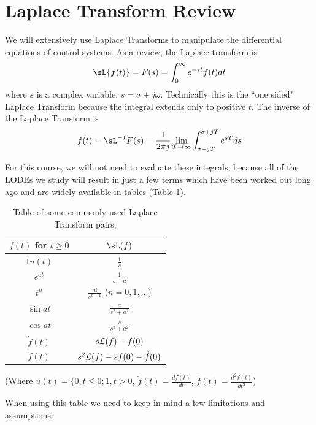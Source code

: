 \section{Laplace Transform Review}

We will extensively use Laplace Transforms to manipulate the differential equations of control systems.  As a review, the Laplace transform is
\[
\sL \{f(t)\} = F(s) =  \int_{0}^{\infty} e^{-st}f(t)dt
\]
where $s$ is a complex variable, $s=\sigma + j \omega$.  Technically this is the ``one sided" Laplace Transform because the integral extends only to positive $t$.
The inverse of the Laplace Transform is
\[
f(t) = \sL^{-1}F(s) = \frac{1}{2\pi j} \lim_{T\to\infty} \int_{\sigma - j T}^{\sigma + jT}e^{sT}ds
\]

For this course, we will not need to evaluate these integrals, because all of the LODEs we study will result in just a few terms which have been worked out long ago and are widely available in tables (Table \ref{LaplaceTransformTable}).



\begin{table}\centering
\renewcommand\arraystretch{2.0}%
\begin{tabular}{|c|c|}
\hline
$ f(t)$ { for} $t \geq 0$ &  $\sL(f)$\\
\hline
$1u(t)$      & $\displaystyle \frac{1}{s}$\\\hline
$e^{at}$ & $\displaystyle \frac{1}{s-a}$\\ \hline
$t^n$    & $\displaystyle \frac{n!}{s^{n+1}}$ ($n = 0,1, \ldots$)\\ \hline
$\sin at$ & $\displaystyle \frac{a}{s^2 + a^2}$\\ \hline
$\cos at$ & $\displaystyle \frac{s}{s^2 + a^2}$\\ \hline
$\dot{f}(t)$ & $s{\cal L}(f)-f(0)$\\ \hline
$\ddot{f}(t)$ & $s^2{\cal L}(f)-sf(0)-\dot{f}(0)$
\\ \hline
\end{tabular}

(Where
$u(t) = \{ 0, t\le 0; 1, t > 0$,
$\dot{f}(t) = \frac{df(t)}{dt}$, $\ddot{f}(t) = \frac{d^2f(t)}{dt^2}$)
\caption{Table of some commonly used Laplace Transform pairs.}\label{LaplaceTransformTable}
\end{table}


When using this table we need to keep in mind a few limitations and assumptions:

